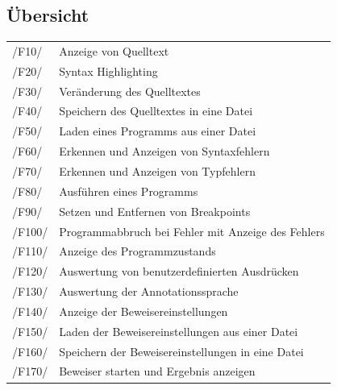 \documentclass[a4paper,10pt]{article}
\begin{document}
\subsection{Übersicht}
\begin{tabular}{| l | l |}
\hline
/F10/ & Anzeige von Quelltext\\
/F20/ & Syntax Highlighting\\
/F30/ & Veränderung des Quelltextes\\
/F40/ & Speichern des Quelltextes in eine Datei\\
/F50/ & Laden eines Programms aus einer Datei\\
/F60/ & Erkennen und Anzeigen von Syntaxfehlern\\
/F70/ & Erkennen und Anzeigen von Typfehlern\\
/F80/ & Ausführen eines Programms\\
/F90/ & Setzen und Entfernen von Breakpoints\\
/F100/ & Programmabbruch bei Fehler mit Anzeige des Fehlers\\
/F110/ & Anzeige des Programmzustands\\
/F120/ & Auswertung von benutzerdefinierten Ausdrücken\\
/F130/ & Auswertung der Annotationssprache\\
/F140/ & Anzeige der Beweisereinstellungen\\
/F150/ & Laden der Beweisereinstellungen aus einer Datei\\
/F160/ & Speichern der Beweisereinstellungen in eine Datei\\
/F170/ & Beweiser starten und Ergebnis anzeigen\\
\hline
\end{tabular}
\end{document}
